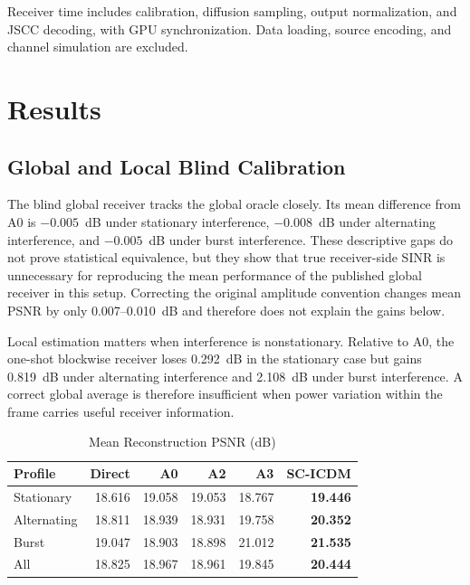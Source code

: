 \documentclass[conference]{IEEEtran}
\newcommand{\method}{SC-ICDM}
\begin{document}
Receiver time includes calibration, diffusion sampling, output normalization,
and JSCC decoding, with GPU synchronization. Data loading, source encoding,
and channel simulation are excluded.

\section{Results}

\subsection{Global and Local Blind Calibration}

The blind global receiver tracks the global oracle closely. Its mean
difference from A0 is $-0.005$~dB under stationary interference, $-0.008$~dB
under alternating interference, and $-0.005$~dB under burst interference.
These descriptive gaps do not prove statistical equivalence, but they show
that true receiver-side SINR is unnecessary for reproducing the mean
performance of the published global receiver in this setup. Correcting the
original amplitude convention changes mean PSNR by only
0.007--0.010~dB and therefore does not explain the gains below.

Local estimation matters when interference is nonstationary. Relative to A0,
the one-shot blockwise receiver loses 0.292~dB in the stationary case but
gains 0.819~dB under alternating interference and 2.108~dB under burst
interference. A correct global average is therefore insufficient when power
variation within the frame carries useful receiver information.

\begin{table}[t]
\caption{Mean Reconstruction PSNR (dB)}
\label{tab:mean_psnr}
\centering
\setlength{\tabcolsep}{3.3pt}
\begin{tabular}{lrrrrr}
\toprule
Profile & Direct & A0 & A2 & A3 & \method{} \\
\midrule
Stationary  & 18.616 & 19.058 & 19.053 & 18.767 & \textbf{19.446} \\
Alternating & 18.811 & 18.939 & 18.931 & 19.758 & \textbf{20.352} \\
Burst       & 19.047 & 18.903 & 18.898 & 21.012 & \textbf{21.535} \\
\midrule
All         & 18.825 & 18.967 & 18.961 & 19.845 & \textbf{20.444} \\
\bottomrule
\end{tabular}
\end{table}
\end{document}
